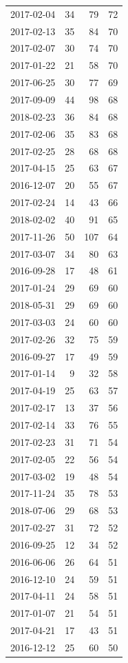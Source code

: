 \begin{tabular}{lrrr}
2017-02-04 & 34 & 79 & 72 \\
2017-02-13 & 35 & 84 & 70 \\
2017-02-07 & 30 & 74 & 70 \\
2017-01-22 & 21 & 58 & 70 \\
2017-06-25 & 30 & 77 & 69 \\
2017-09-09 & 44 & 98 & 68 \\
2018-02-23 & 36 & 84 & 68 \\
2017-02-06 & 35 & 83 & 68 \\
2017-02-25 & 28 & 68 & 68 \\
2017-04-15 & 25 & 63 & 67 \\
2016-12-07 & 20 & 55 & 67 \\
2017-02-24 & 14 & 43 & 66 \\
2018-02-02 & 40 & 91 & 65 \\
2017-11-26 & 50 & 107 & 64 \\
2017-03-07 & 34 & 80 & 63 \\
2016-09-28 & 17 & 48 & 61 \\
2017-01-24 & 29 & 69 & 60 \\
2018-05-31 & 29 & 69 & 60 \\
2017-03-03 & 24 & 60 & 60 \\
2017-02-26 & 32 & 75 & 59 \\
2016-09-27 & 17 & 49 & 59 \\
2017-01-14 & 9 & 32 & 58 \\
2017-04-19 & 25 & 63 & 57 \\
2017-02-17 & 13 & 37 & 56 \\
2017-02-14 & 33 & 76 & 55 \\
2017-02-23 & 31 & 71 & 54 \\
2017-02-05 & 22 & 56 & 54 \\
2017-03-02 & 19 & 48 & 54 \\
2017-11-24 & 35 & 78 & 53 \\
2018-07-06 & 29 & 68 & 53 \\
2017-02-27 & 31 & 72 & 52 \\
2016-09-25 & 12 & 34 & 52 \\
2016-06-06 & 26 & 64 & 51 \\
2016-12-10 & 24 & 59 & 51 \\
2017-04-11 & 24 & 58 & 51 \\
2017-01-07 & 21 & 54 & 51 \\
2017-04-21 & 17 & 43 & 51 \\
2016-12-12 & 25 & 60 & 50 \\

\end{tabular}
